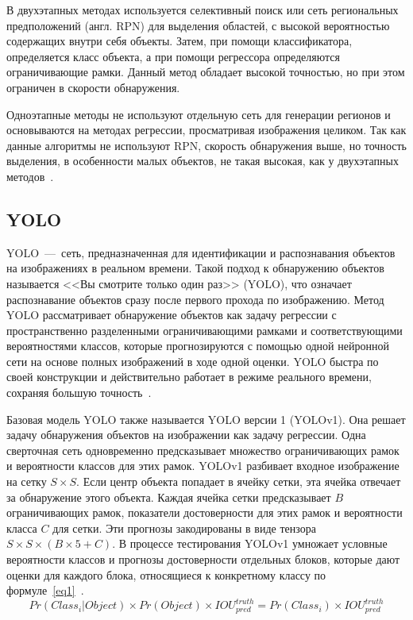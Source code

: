 \clearpage
В двухэтапных методах используется селективный поиск или сеть региональных предположений (англ. RPN) для выделения областей, с высокой вероятностью содержащих внутри себя объекты.
Затем, при помощи классификатора, определяется класс объекта, а при помощи регрессора определяются ограничивающие рамки.
Данный метод обладает высокой точностью, но при этом ограничен в скорости обнаружения.

Одноэтапные методы не используют отдельную сеть для генерации регионов и основываются на методах регрессии, просматривая изображения целиком.
Так как данные алгоритмы не используют RPN, скорость обнаружения выше, но точность выделения, в особенности малых объектов, не такая высокая, как у двухэтапных методов~\cite{base}.

\subsection{YOLO}

YOLO~---~сеть, предназначенная для идентификации и распознавания объектов на изображениях в реальном времени.
Такой подход к обнаружению объектов называется <<Вы смотрите только один раз>> (YOLO), что означает распознавание объектов сразу после первого прохода по изображению.
Метод YOLO рассматривает обнаружение объектов как задачу регрессии с пространственно разделенными ограничивающими рамками и соответствующими вероятностями классов, которые прогнозируются с помощью одной нейронной сети на основе полных изображений в ходе одной оценки.
YOLO быстра по своей конструкции и действительно работает в режиме реального времени, сохраняя большую точность~\cite{base, all}.

Базовая модель YOLO также называется YOLO версии 1 (YOLOv1).
Она решает задачу обнаружения объектов на изображении как задачу регрессии.
Одна сверточная сеть одновременно предсказывает множество ограничивающих рамок и вероятности классов для этих рамок.
YOLOv1 разбивает входное изображение на сетку $S \times S$.
Если центр объекта попадает в ячейку сетки, эта ячейка отвечает за обнаружение этого объекта.
Каждая ячейка сетки предсказывает $B$ ограничивающих рамок, показатели достоверности для этих рамок и вероятности класса $C$ для сетки.
Эти прогнозы закодированы в виде тензора $S \times S \times (B \times 5 + C)$.
В процессе тестирования YOLOv1 умножает условные вероятности классов и прогнозы достоверности отдельных блоков, которые дают оценки для каждого блока, относящиеся к конкретному классу по формуле~\ref{eq1}~\cite{all}.
\begin{equation}
	\label{eq1}
	Pr(Class_{i} | Object) \times Pr(Object) \times IOU^{truth}_{pred} = Pr(Class_{i}) \times IOU^{truth}_{pred}
\end{equation}


